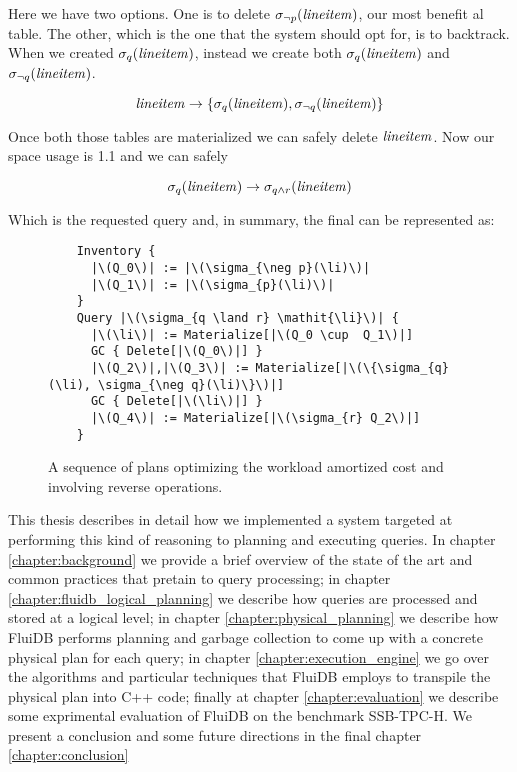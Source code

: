 Here we have two options. One is to delete \(\sigma_{\neg
  p}(\mathit{lineitem})\), our most benefit al table. The other, which is the one
that the system should opt for, is to backtrack. When we created
\(\sigma_{q}(\mathit{lineitem})\), instead we create both
\(\sigma_{q}(\mathit{lineitem})\) and \(\sigma_{\neg q}(\mathit{lineitem})\).

\[
  \mathit{lineitem} \rightarrow \{\sigma_{q}(\mathit{lineitem}), \sigma_{\neg q}(\mathit{lineitem})\}
\]

Once both those tables are materialized we can safely delete
\(\mathit{lineitem}\). Now our space usage is 1.1 and we can safely

\[
  \sigma_{q}(\mathit{lineitem}) \rightarrow \sigma_{q \land r} (\mathit{lineitem})
\]

Which is the requested query and, in summary, the final can be
represented as:


\begin{figure}[H]
\begin{verbatim}
    Inventory {
      |\(Q_0\)| := |\(\sigma_{\neg p}(\li)\)|
      |\(Q_1\)| := |\(\sigma_{p}(\li)\)|
    }
    Query |\(\sigma_{q \land r} \mathit{\li}\)| {
      |\(\li\)| := Materialize[|\(Q_0 \cup  Q_1\)|]
      GC { Delete[|\(Q_0\)|] }
      |\(Q_2\)|,|\(Q_3\)| := Materialize[|\(\{\sigma_{q}(\li), \sigma_{\neg q}(\li)\}\)|]
      GC { Delete[|\(\li\)|] }
      |\(Q_4\)| := Materialize[|\(\sigma_{r} Q_2\)|]
    }
\end{verbatim}
  \caption{\label{fig:reverse_operations}A sequence of plans optimizing
    the workload amortized cost and involving reverse operations.}
\end{figure}

This thesis describes in detail how we implemented a system targeted
at performing this kind of reasoning to planning and executing
queries. In chapter \ref{chapter:background} we provide a brief
overview of the state of the art and common practices that pretain to
query processing; in chapter \ref{chapter:fluidb_logical_planning} we
describe how queries are processed and stored at a logical level; in
chapter \ref{chapter:physical_planning} we describe how FluiDB
performs planning and garbage collection to come up with a concrete
physical plan for each query; in chapter
\ref{chapter:execution_engine} we go over the algorithms and
particular techniques that FluiDB employs to transpile the physical
plan into C++ code; finally at chapter \ref{chapter:evaluation} we
describe some exprimental evaluation of FluiDB on the benchmark
SSB-TPC-H. We present a conclusion and some future directions in the
final chapter \ref{chapter:conclusion}
